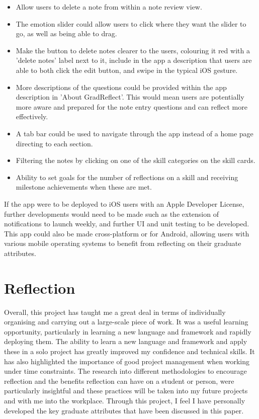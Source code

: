 \documentclass{l4proj}
\begin{document}
\begin{itemize}
    \item Allow users to delete a note from within a note review view.
    \item The emotion slider could allow users to click where they want the slider to go, as well as being able to drag.
    \item Make the button to delete notes clearer to the users, colouring it red with a 'delete notes' label next to it, include in the app a description that users are able to both click the edit button, and swipe in the typical iOS gesture.
    \item More descriptions of the questions could be provided within the app description in 'About GradReflect'. This would mean users are potentially more aware and prepared for the note entry questions and can reflect more effectively.
    \item A tab bar could be used to navigate through the app instead of a home page directing to each section.
    \item Filtering the notes by clicking on one of the skill categories on the skill cards.
    \item Ability to set goals for the number of reflections on a skill and receiving milestone achievements when these are met.
\end{itemize}

If the app were to be deployed to iOS users with an Apple Developer License, further developments would need to be made such as the extension of notifications to launch weekly, and further UI and unit testing to be developed. This app could also be made cross-platform or for Android, allowing users with various mobile operating systems to benefit from reflecting on their graduate attributes.

\section{Reflection}

Overall, this project has taught me a great deal in terms of individually organising and carrying out a large-scale piece of work. It was a useful learning opportunity, particularly in learning a new language and framework and rapidly deploying them. The ability to learn a new language and framework and apply these in a solo project has greatly improved my confidence and technical skills. It has also highlighted the importance of good project management when working under time constraints. The research into different methodologies to encourage reflection and the benefits reflection can have on a student or person, were particularly insightful and these practices will be taken into my future projects and with me into the workplace. Through this project, I feel I have personally developed the key graduate attributes that have been discussed in this paper.
\end{document}
